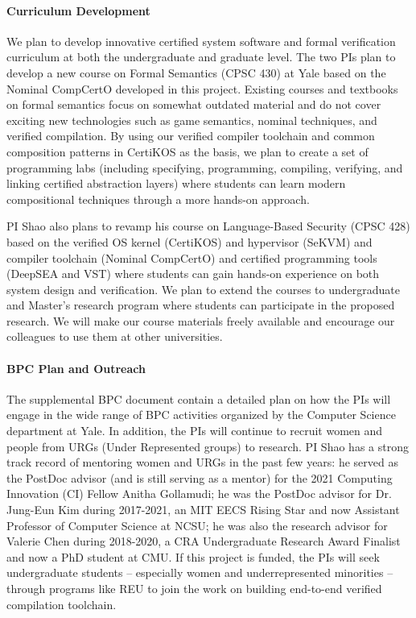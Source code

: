 \paragraph*{Curriculum Development}
We plan to develop innovative certified system software and formal
verification curriculum at both the undergraduate and graduate
level. The two PIs plan to develop a new course on Formal Semantics
(CPSC 430) at Yale based on the Nominal CompCertO developed in this
project. Existing courses and textbooks on formal semantics focus on
somewhat outdated material and do not cover exciting new technologies
such as game semantics, nominal techniques, and verified
compilation. By using our verified compiler toolchain and common
composition patterns in CertiKOS as the basis, we plan to
create a set of programming labs (including specifying, programming,
compiling, verifying, and linking certified abstraction layers) where
students can learn modern compositional techniques through a more
hands-on approach.

PI Shao also plans to revamp his course on Language-Based Security
(CPSC 428) based on the verified OS kernel (CertiKOS) and hypervisor
(SeKVM) and compiler toolchain (Nominal CompCertO) and certified
programming tools (DeepSEA and VST) where students can gain hands-on
experience on both system design and verification. We plan to extend
the courses to undergraduate and Master's research program where
students can participate in the proposed research. We will make our
course materials freely available and encourage our colleagues to use
them at other universities.

\vspace*{-2ex}
\paragraph*{BPC Plan and Outreach}
The supplemental BPC document contain a detailed plan on how the PIs
will engage in the wide range of BPC activities organized by the
Computer Science department at Yale. In addition, the PIs will
continue to recruit women and people from URGs (Under Represented
groups) to research.  PI Shao has a strong track record of mentoring
women and URGs in the past few years: he served as the PostDoc advisor
(and is still serving as a mentor) for the 2021 Computing Innovation
(CI) Fellow Anitha Gollamudi; he was the PostDoc advisor for
Dr. Jung-Eun Kim during 2017-2021, an MIT EECS Rising Star and now
Assistant Professor of Computer Science at NCSU; he was also the
research advisor for Valerie Chen during 2018-2020, a CRA
Undergraduate Research Award Finalist and now a PhD student at CMU.
If this project is funded, the PIs will seek undergraduate students –
especially women and underrepresented minorities – through programs
like REU to join the work on building end-to-end verified compilation
toolchain.


